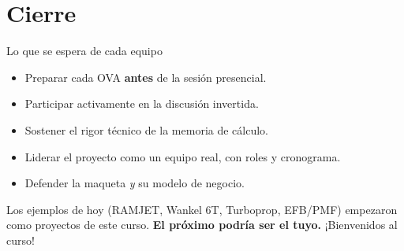 \documentclass[aspectratio=169]{beamer}
\begin{document}
\section{Cierre}
\begin{frame}{Lo que se espera de cada equipo}
  \begin{itemize}
    \item Preparar cada OVA \textbf{antes} de la sesión presencial.
    \item Participar activamente en la discusión invertida.
    \item Sostener el rigor técnico de la memoria de cálculo.
    \item Liderar el proyecto como un equipo real, con roles y cronograma.
    \item Defender la maqueta \emph{y} su modelo de negocio.
  \end{itemize}
  \vspace{0.3cm}
  Los ejemplos de hoy (RAMJET, Wankel 6T, Turboprop, EFB/PMF) empezaron como proyectos de este curso.
  \textbf{El próximo podría ser el tuyo.}
  \vspace{0.3cm}
  \centering \Large ¡Bienvenidos al curso!
\end{frame}
\end{document}
